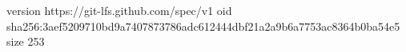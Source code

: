 version https://git-lfs.github.com/spec/v1
oid sha256:3aef5209710bd9a7407873786adc612444dbf21a2a9b6a7753ac8364b0ba54e5
size 253
